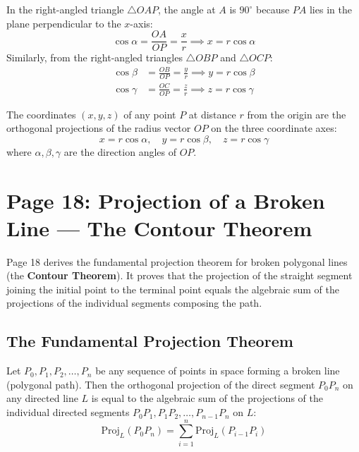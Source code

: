 In the right-angled triangle $\triangle OAP$, the angle at $A$ is $90^\circ$ because $PA$ lies in the plane perpendicular to the $x$-axis:
\begin{equation}
    \cos\alpha = \frac{OA}{OP} = \frac{x}{r} \implies \boxed{x = r\cos\alpha}
\end{equation}
Similarly, from the right-angled triangles $\triangle OBP$ and $\triangle OCP$:
\begin{align}
    \cos\beta &= \frac{OB}{OP} = \frac{y}{r} \implies \boxed{y = r\cos\beta} \\
    \cos\gamma &= \frac{OC}{OP} = \frac{z}{r} \implies \boxed{z = r\cos\gamma}
\end{align}

\begin{theorembox}
The coordinates $(x,y,z)$ of any point $P$ at distance $r$ from the origin are the orthogonal projections of the radius vector $OP$ on the three coordinate axes:
\begin{equation}
    x = r\cos\alpha, \quad y = r\cos\beta, \quad z = r\cos\gamma
\end{equation}
where $\alpha, \beta, \gamma$ are the direction angles of $OP$.
\end{theorembox}

\section{Page 18: Projection of a Broken Line --- The Contour Theorem}
\label{sec:page18}

\begin{conceptbox}
Page 18 derives the fundamental projection theorem for broken polygonal lines (the \textbf{Contour Theorem}). It proves that the projection of the straight segment joining the initial point to the terminal point equals the algebraic sum of the projections of the individual segments composing the path.
\end{conceptbox}

\subsection{The Fundamental Projection Theorem}
\begin{theorembox}
Let $P_0, P_1, P_2, \dots, P_n$ be any sequence of points in space forming a broken line (polygonal path). Then the orthogonal projection of the direct segment $P_0 P_n$ on any directed line $L$ is equal to the algebraic sum of the projections of the individual directed segments $P_0 P_1, P_1 P_2, \dots, P_{n-1} P_n$ on $L$:
\begin{equation}
    \boxed{\text{Proj}_L(P_0 P_n) = \sum_{i=1}^n \text{Proj}_L(P_{i-1} P_i)}
\end{equation}
\end{theorembox}

